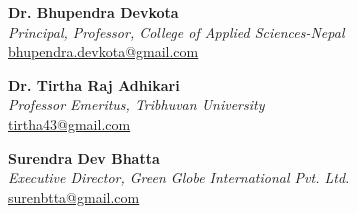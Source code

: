 \documentclass[a4paper, 09pt]{extarticle}
\begin{document}
\noindent
\textbf{Dr. Bhupendra Devkota}\\[2pt]
\textit{Principal, Professor, College of Applied Sciences-Nepal}\\
\href{mailto:bhupendra.devkota@gmail.com}{bhupendra.devkota@gmail.com}

\vspace{10pt}

\noindent
\textbf{Dr. Tirtha Raj Adhikari}\\[2pt]
\textit{Professor Emeritus, Tribhuvan University}\\
\href{mailto:tirtha43@gmail.com}{tirtha43@gmail.com}

\vspace{5pt}

\noindent
\textbf{Surendra Dev Bhatta}\\[2pt]
\textit{Executive Director, Green Globe International Pvt. Ltd.}\\
\href{mailto:surenbtta@gmail.com}{surenbtta@gmail.com}
\end{document}
